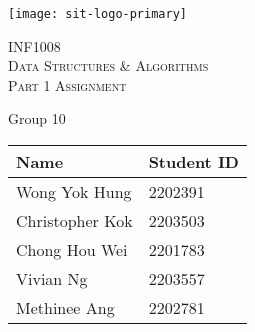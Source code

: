 \documentclass{report}
\begin{document}
\begin{titlepage}
	\centering
	\texttt{[image: sit-logo-primary]}\par\vspace{1cm}
	{\scshape\Huge{INF1008}\\Data Structures \& Algorithms\\\Large{Part 1 Assignment}\par}
	\vspace{1cm}
	{\huge{Group 10}\par}
	\vspace{0.5cm}
	\begin{table}[H]
		\large
		\centering\begin{tabular}{ll}
			\toprule
			Name & Student ID\\
			\midrule
			Wong Yok Hung & 2202391\\
			Christopher Kok & 2203503\\
			Chong Hou Wei & 2201783\\
			Vivian Ng & 2203557\\
			Methinee Ang & 2202781\\
			\bottomrule
		\end{tabular}
	\end{table}
	\vfill
\end{titlepage}
\newpage%
\tableofcontents
\listoffigures
\pagebreak
\end{document}
